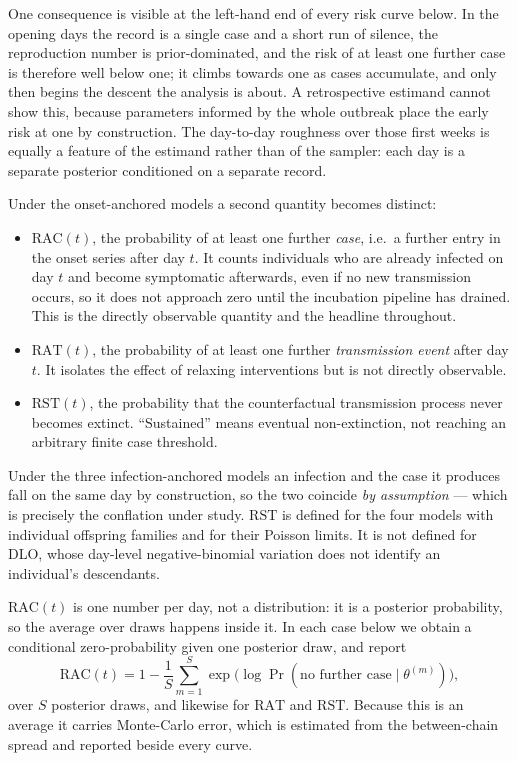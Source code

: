 \documentclass[11pt,a4paper]{article}
\theoremstyle{plain}
\theoremstyle{definition}
\newcommand{\RAC}{\mathrm{RAC}}
\newcommand{\RAT}{\mathrm{RAT}}
\newcommand{\RST}{\mathrm{RST}}
\newcommand{\dlo}{DLO}
\begin{document}
One consequence is visible at the left-hand end of every risk curve below. In the opening days
the record is a single case and a short run of silence, the reproduction number is
prior-dominated, and the risk of at least one further case is therefore well below one; it
climbs towards one as cases accumulate, and only then begins the descent the analysis is about.
A retrospective estimand cannot show this, because parameters informed by the whole outbreak
place the early risk at one by construction. The day-to-day roughness over those first weeks is
equally a feature of the estimand rather than of the sampler: each day is a separate posterior
conditioned on a separate record.

Under the onset-anchored models a second quantity becomes distinct:

\begin{itemize}
  \item $\RAC(t)$, the probability of at least one further \emph{case}, i.e.\ a further entry in
    the onset series after day $t$. It counts individuals who are already infected on day $t$ and
    become symptomatic afterwards, even if no new transmission occurs, so it does not approach
    zero until the incubation pipeline has drained. This is the directly observable quantity and
    the headline throughout.
  \item $\RAT(t)$, the probability of at least one further \emph{transmission event} after day
    $t$. It isolates the effect of relaxing interventions but is not directly observable.
  \item $\RST(t)$, the probability that the counterfactual transmission process never becomes
    extinct. ``Sustained'' means eventual non-extinction, not reaching an arbitrary finite case
    threshold.
\end{itemize}

\noindent
Under the three infection-anchored models an infection and the case it produces fall on the same
day by construction, so the two coincide \emph{by assumption} --- which is precisely the
conflation under study. $\RST$ is defined for the four models with individual offspring families
and for their Poisson limits. It is not defined for \dlo{}, whose day-level negative-binomial
variation does not identify an individual's descendants.

$\RAC(t)$ is one number per day, not a distribution: it is a posterior probability, so the
average over draws happens inside it. In each case below we obtain a conditional
zero-probability given one posterior draw, and report
\begin{equation}
\RAC(t) = 1 - \frac{1}{S}\sum_{m=1}^{S}\exp\bigl(\log \Pr(\text{no further case} \mid
  \theta^{(m)})\bigr),
  \label{eq:posterior-average}
\end{equation}
over $S$ posterior draws, and likewise for $\RAT$ and $\RST$. Because this is an average it carries
Monte-Carlo error, which is estimated from the between-chain spread and reported beside every
curve.
\end{document}
